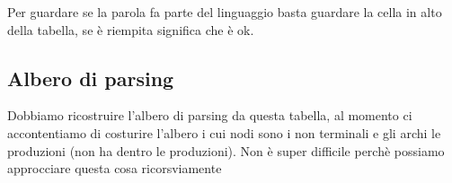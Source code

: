 Per guardare se la parola fa parte del linguaggio basta guardare la cella in alto della tabella, se è riempita significa che è ok.
\subsection{Albero di parsing}
Dobbiamo ricostruire l'albero di parsing da questa tabella, al momento ci accontentiamo di costurire l'albero i cui nodi sono i non terminali e gli archi le produzioni (non ha dentro le produzioni). Non è super difficile perchè possiamo approcciare questa cosa ricorsviamente

\begin{lstlisting}
    
\end{lstlisting}